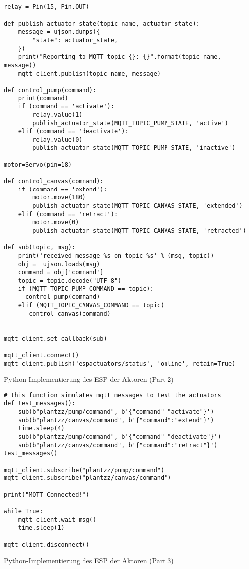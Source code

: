 \begin{listing}[!ht]
\begin{verbatim}


relay = Pin(15, Pin.OUT)

def publish_actuator_state(topic_name, actuator_state):
    message = ujson.dumps({
        "state": actuator_state,
    })
    print("Reporting to MQTT topic {}: {}".format(topic_name, message))
    mqtt_client.publish(topic_name, message)
    
def control_pump(command):
    print(command)
    if (command == 'activate'):
        relay.value(1)
        publish_actuator_state(MQTT_TOPIC_PUMP_STATE, 'active')
    elif (command == 'deactivate'):
        relay.value(0)
        publish_actuator_state(MQTT_TOPIC_PUMP_STATE, 'inactive')

motor=Servo(pin=18)

def control_canvas(command):
    if (command == 'extend'):
        motor.move(180)
        publish_actuator_state(MQTT_TOPIC_CANVAS_STATE, 'extended')
    elif (command == 'retract'):
        motor.move(0)
        publish_actuator_state(MQTT_TOPIC_CANVAS_STATE, 'retracted')

def sub(topic, msg):
    print('received message %s on topic %s' % (msg, topic))
    obj =  ujson.loads(msg)
    command = obj['command']
    topic = topic.decode("UTF-8")
    if (MQTT_TOPIC_PUMP_COMMAND == topic):
      control_pump(command)
    elif (MQTT_TOPIC_CANVAS_COMMAND == topic):
       control_canvas(command)
    

mqtt_client.set_callback(sub)

mqtt_client.connect()
mqtt_client.publish('espactuators/status', 'online', retain=True)
\end{verbatim}
\caption{Python-Implementierung des ESP der Aktoren (Part 2)}
\label{list:wokwi_aktoren2}
\end{listing}



\begin{listing}[!ht]
\begin{verbatim}
# this function simulates mqtt messages to test the actuators
def test_messages():
    sub(b"plantzz/pump/command", b'{"command":"activate"}')
    sub(b"plantzz/canvas/command", b'{"command":"extend"}')
    time.sleep(4)
    sub(b"plantzz/pump/command", b'{"command":"deactivate"}')
    sub(b"plantzz/canvas/command", b'{"command":"retract"}')
test_messages()

mqtt_client.subscribe("plantzz/pump/command")
mqtt_client.subscribe("plantzz/canvas/command")

print("MQTT Connected!")

while True:
    mqtt_client.wait_msg()
    time.sleep(1)

mqtt_client.disconnect()
\end{verbatim}
\caption{Python-Implementierung des ESP der Aktoren (Part 3)}
\label{list:wokwi_aktoren3}
\end{listing}

